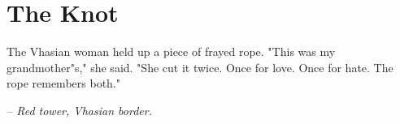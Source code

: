 \chapter*{The Knot}

The Vhasian woman held up a piece of frayed rope. "This was my grandmother"s," she said. "She cut it twice. Once for love. Once for hate. The rope remembers both."

\smallskip

\noindent \textit{-- Red tower, Vhasian border.}

